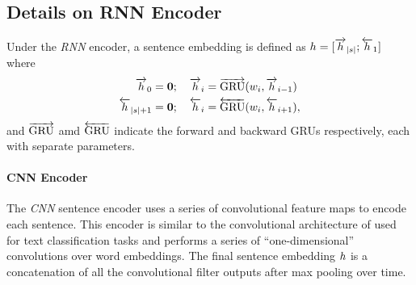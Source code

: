 \begin{toappendix}
\section{Details on RNN Encoder} \label{app:rnnencoder}
  
Under the \textit{RNN} encoder, a sentence embedding is defined as
$\sentEmb = [\rSentEmb[\sentSize]; \lSentEmb[1]]$
where 
\begin{align} 
  \rSentEmb[0] = \mathbf{0} &;\quad 
       \rSentEmb[i] = \rgru(\wordEmb[i], \rSentEmb[i-1]) \\
  \lSentEmb[\sentSize + 1] = \mathbf{0} &;\quad 
       \lSentEmb[i] = \lgru(\wordEmb[i], \lSentEmb[i+1]),
\end{align}
and $\overrightarrow{\operatorname{GRU}}$ amd $\overleftarrow{\operatorname{GRU}}$ indicate the 
forward and backward GRUs respectively, each with separate 
parameters.
\end{toappendix}


\paragraph{CNN Encoder} The \textit{CNN} sentence encoder uses a series of 
convolutional feature maps to encode each sentence. This encoder is similar
to the convolutional architecture of \cite{kim2014convolutional} used for text
classification
tasks and performs a series of ``one-dimensional'' convolutions over 
word embeddings. The final sentence embedding $\sentEmb$ is a concatenation
of all the convolutional filter outputs after max pooling over time.


